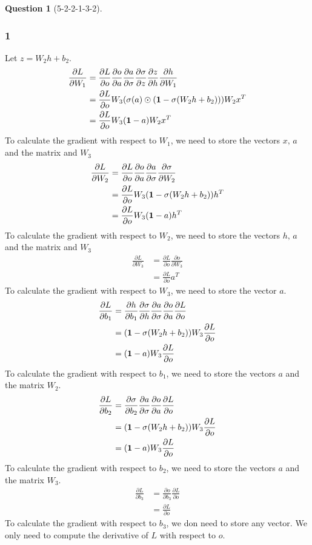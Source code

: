 \documentclass[12pt]{article}
\theoremstyle{definition}
\newtheorem{exercise}{Question}%
\newcommand{\pder}[2]{\frac{\partial #1}{\partial #2}}
\begin{document}
\begin{exercise}[5-2-2-1-3-2]
{\subsubsection*{1}
Let $z=W_{2}h+b_{2}$.
  \begin{align*}
    \pder{L}{W_1} &= \pder{L}{o} \pder{o}{a} \pder{a}{\sigma} \pder{\sigma}{z}\pder{z}{h}\pder{h}{W_{1}}\\
    &= \pder{L}{o} W_{3} (\sigma(a)\odot(\bold{1}-\sigma(W_{2}h+b_{2})))W_{2}x^{T}\\
    &= \pder{L}{o} W_{3} (\bold{1}-a) W_{2} x^{T}
  \end{align*}
  To calculate the gradient with respect to $W_{1}$, we need to store the
  vectors $x,\, a $ and the matrix and $W_{3}$
  \begin{align*}
    \pder{L}{W_2} &= \pder{L}{o}\pder{o}{a} \pder{a}{\sigma} \pder{\sigma}{W_{2}} \\
    &= \pder{L}{o}  W_{3} (\bold{1}-\sigma(W_{2}h+b_{2}))h^{T}\\
    &= \pder{L}{o} W_{3} (\bold{1}-a) h^{T}
  \end{align*}
  To calculate the gradient with respect to $W_{2}$, we need to store the
  vectors $ h,\, a $ and the matrix and $W_{3}$
  \begin{align*}
    \pder{L}{W_3} &= \pder{L}{o}\pder{o}{W_{3}} \\
    &= \pder{L}{o}a^{T}
  \end{align*}
  To calculate the gradient with respect to $W_{3}$, we need to store the
  vector $a$.
  \begin{align*}
    \pder{L}{b_{1}} &=   \pder{h}{b_{1}}\pder{\sigma}{h}\pder{a}{\sigma} \pder{o}{a} \pder{L}{o}\\
    &= (\bold{1}-\sigma(W_{2}h+b_{2})) W_{3} \pder{L}{o}\\
    &= (\bold{1}-a) W_{3} \pder{L}{o}
  \end{align*}
  To calculate the gradient with respect to $b_{1}$, we need to store the
  vectors $ a $ and the matrix $W_{2}$.
  \begin{align*}
    \pder{L}{b_{2}} &=\pder{\sigma}{b_{2}} \pder{a}{\sigma} \pder{o}{a} \pder{L}{o}\\
    &=  (\bold{1}-\sigma(W_{2}h+b_{2})) W_{3} \pder{L}{o}\\
    &=  (\bold{1}-a) W_{3} \pder{L}{o}
  \end{align*}
  To calculate the gradient with respect to $b_{2}$, we need to store the
  vectors $ a $ and the matrix $W_{3}$.
  \begin{align*}
    \pder{L}{b_{3}} &= \pder{o}{b_{3}} \pder{L}{o}\\
    &= \pder{L}{o}
  \end{align*}
  To calculate the gradient with respect to $b_{3}$, we don need to store any
  vector. We only need to compute the derivative of $L$ with respect to $o$.
}
\end{exercise}
\end{document}
